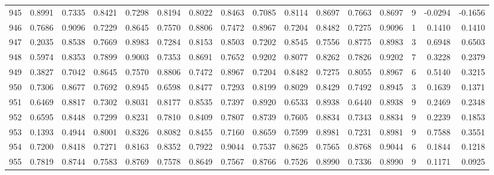 \begin{tabular}{lrrrrrrrrrrrrrrr}
945 &      0.8991 &  0.7335 &  0.8421 &  0.7298 &  0.8194 &  0.8022 &  0.8463 &  0.7085 &  0.8114 &  0.8697 &   0.7663 &     0.8697 &      9 &                   -0.0294 &                    -0.1656 \\
946 &      0.7686 &  0.9096 &  0.7229 &  0.8645 &  0.7570 &  0.8806 &  0.7472 &  0.8967 &  0.7204 &  0.8482 &   0.7275 &     0.9096 &      1 &                    0.1410 &                     0.1410 \\
947 &      0.2035 &  0.8538 &  0.7669 &  0.8983 &  0.7284 &  0.8153 &  0.8503 &  0.7202 &  0.8545 &  0.7556 &   0.8775 &     0.8983 &      3 &                    0.6948 &                     0.6503 \\
948 &      0.5974 &  0.8353 &  0.7899 &  0.9003 &  0.7353 &  0.8691 &  0.7652 &  0.9202 &  0.8077 &  0.8262 &   0.7826 &     0.9202 &      7 &                    0.3228 &                     0.2379 \\
949 &      0.3827 &  0.7042 &  0.8645 &  0.7570 &  0.8806 &  0.7472 &  0.8967 &  0.7204 &  0.8482 &  0.7275 &   0.8055 &     0.8967 &      6 &                    0.5140 &                     0.3215 \\
950 &      0.7306 &  0.8677 &  0.7692 &  0.8945 &  0.6598 &  0.8477 &  0.7293 &  0.8199 &  0.8029 &  0.8429 &   0.7492 &     0.8945 &      3 &                    0.1639 &                     0.1371 \\
951 &      0.6469 &  0.8817 &  0.7302 &  0.8031 &  0.8177 &  0.8535 &  0.7397 &  0.8920 &  0.6533 &  0.8938 &   0.6440 &     0.8938 &      9 &                    0.2469 &                     0.2348 \\
952 &      0.6595 &  0.8448 &  0.7299 &  0.8231 &  0.7810 &  0.8409 &  0.7807 &  0.8739 &  0.7605 &  0.8834 &   0.7343 &     0.8834 &      9 &                    0.2239 &                     0.1853 \\
953 &      0.1393 &  0.4944 &  0.8001 &  0.8326 &  0.8082 &  0.8455 &  0.7160 &  0.8659 &  0.7599 &  0.8981 &   0.7231 &     0.8981 &      9 &                    0.7588 &                     0.3551 \\
954 &      0.7200 &  0.8418 &  0.7271 &  0.8163 &  0.8352 &  0.7922 &  0.9044 &  0.7537 &  0.8625 &  0.7565 &   0.8768 &     0.9044 &      6 &                    0.1844 &                     0.1218 \\
955 &      0.7819 &  0.8744 &  0.7583 &  0.8769 &  0.7578 &  0.8649 &  0.7567 &  0.8766 &  0.7526 &  0.8990 &   0.7336 &     0.8990 &      9 &                    0.1171 &                     0.0925 \\

\end{tabular}
